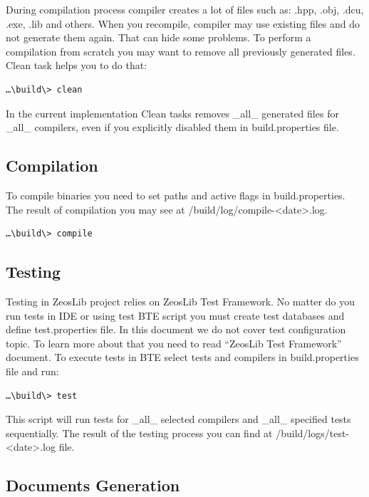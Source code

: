 \documentclass[a4paper,12pt,oneside]{book}
\begin{document}
During compilation process compiler creates a lot of files such as:
.hpp, .obj, .dcu, .exe, .lib and others.
When you recompile, compiler may use existing files and do not generate them again.
That can hide some problems.
To perform a compilation from scratch you may want to remove all previously generated files.
Clean task helps you to do that:

\begin{verbatim}
…\build\> clean
\end{verbatim}

In the current implementation Clean tasks removes \_all\_ generated files for \_all\_ compilers, even if you explicitly disabled them in build.properties file.

\subsection{Compilation}

To compile binaries you need to set paths and active flags in build.properties.
The result of compilation you may see at /build/log/compile-\textless date\textgreater.log.

\begin{verbatim}
…\build\> compile
\end{verbatim}

\subsection{Testing}

Testing in ZeosLib project relies on ZeosLib Test Framework.
No matter do you run tests in IDE or using test BTE script you must create test databases and define test.properties file.
In this document we do not cover test configuration topic.
To learn more about that you need to read “ZeosLib Test Framework” document.
To execute tests in BTE select tests and compilers in build.properties file and run:

\begin{verbatim}
…\build\> test
\end{verbatim}

This script will run tests for \_all\_ selected compilers and \_all\_ specified tests sequentially.
The result of the testing process you can find at /build/logs/test-\textless date\textgreater.log file.

\subsection{Documents Generation}
\end{document}
